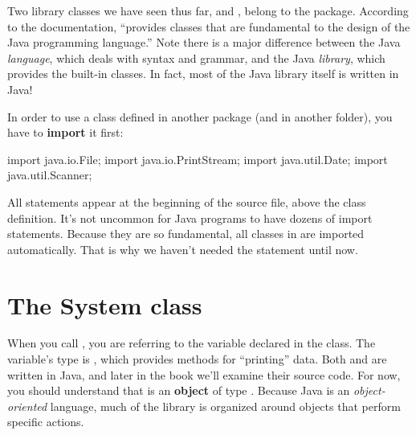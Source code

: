 Two library classes we have seen thus far,  and , belong to the  package. According to the documentation,  ``provides classes that are fundamental to the design of the Java programming language.''
Note there is a major difference between the Java {\em language}, which deals with syntax and grammar, and the Java {\em library}, which provides the built-in classes.
In fact, most of the Java library itself is written in Java!


In order to use a class defined in another package (and in another folder), you have to {\bf import} it first:

\begin{code}
import java.io.File;
import java.io.PrintStream;
import java.util.Date;
import java.util.Scanner;
\end{code}

All  statements appear at the beginning of the source file, above the class definition.
It's not uncommon for Java programs to have dozens of import statements.
Because they are so fundamental, all classes in  are imported automatically.
That is why we haven't needed the  statement until now.


\section{The System class}
\label{system}


When you call , you are referring to the  variable declared in the  class.
The  variable's type is , which provides methods for ``printing'' data.
Both  and  are written in Java, and later in the book we'll examine their source code.
For now, you should understand that  is an {\bf object} of type .
Because Java is an {\em object-oriented} language, much of the library is organized around objects that perform specific actions.

